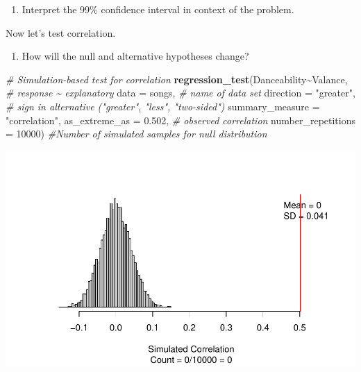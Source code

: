 \documentclass[
]{report}
\newenvironment{Shaded}{\begin{snugshade}}{\end{snugshade}}
\newcommand{\AttributeTok}[1]{\textcolor[rgb]{0.13,0.29,0.53}{#1}}
\newcommand{\CommentTok}[1]{\textcolor[rgb]{0.56,0.35,0.01}{\textit{#1}}}
\newcommand{\DecValTok}[1]{\textcolor[rgb]{0.00,0.00,0.81}{#1}}
\newcommand{\FloatTok}[1]{\textcolor[rgb]{0.00,0.00,0.81}{#1}}
\newcommand{\FunctionTok}[1]{\textcolor[rgb]{0.13,0.29,0.53}{\textbf{#1}}}
\newcommand{\NormalTok}[1]{#1}
\newcommand{\SpecialCharTok}[1]{\textcolor[rgb]{0.81,0.36,0.00}{\textbf{#1}}}
\newcommand{\StringTok}[1]{\textcolor[rgb]{0.31,0.60,0.02}{#1}}
\providecommand{\tightlist}{%
  \setlength{\itemsep}{0pt}\setlength{\parskip}{0pt}}
\begin{document}
\begin{enumerate}
\def\labelenumi{\arabic{enumi}.}
\setcounter{enumi}{8}
\tightlist
\item
  Interpret the 99\% confidence interval in context of the problem.
\end{enumerate}

\vspace{1in}

Now let's test correlation.

\begin{enumerate}
\def\labelenumi{\arabic{enumi}.}
\setcounter{enumi}{9}
\tightlist
\item
  How will the null and alternative hypotheses change?
\end{enumerate}

\vspace{0.5in}

\begin{Shaded}
\begin{Highlighting}[]
\CommentTok{\# Simulation{-}based test for correlation}
\FunctionTok{regression\_test}\NormalTok{(Danceability}\SpecialCharTok{\textasciitilde{}}\NormalTok{Valance, }\CommentTok{\# response \textasciitilde{} explanatory}
                \AttributeTok{data =}\NormalTok{ songs, }\CommentTok{\# name of data set}
                \AttributeTok{direction =} \StringTok{"greater"}\NormalTok{, }\CommentTok{\# sign in alternative ("greater", "less", "two{-}sided")}
                \AttributeTok{summary\_measure =}  \StringTok{"correlation"}\NormalTok{, }
                \AttributeTok{as\_extreme\_as =} \FloatTok{0.502}\NormalTok{, }\CommentTok{\# observed correlation}
                \AttributeTok{number\_repetitions =} \DecValTok{10000}\NormalTok{) }\CommentTok{\#Number of simulated samples for null distribution}
\end{Highlighting}
\end{Shaded}

\begin{center}\includegraphics[width=0.7\linewidth]{14-UR-module13_review_files/figure-latex/unnamed-chunk-5-1} \end{center}
\end{document}
